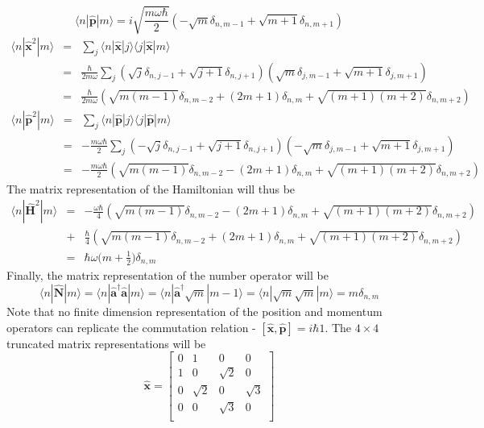 \documentclass[a4paper]{article}
\begin{document}
$$
\langle n|\mathbf{\hat{p}}|m\rangle=i\sqrt{\frac{m\omega\hbar}{2}}(-\sqrt{m}\delta_{n,m-1}+\sqrt{m+1}\delta_{n,m+1})
$$
\begin{eqnarray}
\langle n|\mathbf{\hat{x}}^2|m\rangle&=&\sum_j\langle n|\mathbf{\hat{x}}|j\rangle\langle j|\mathbf{\hat{x}}|m\rangle\nonumber\\&=&\frac{\hbar}{2m\omega}\sum_j(\sqrt{j}\delta_{n,j-1}+\sqrt{j+1}\delta_{n,j+1})(\sqrt{m}\delta_{j,m-1}+\sqrt{m+1}\delta_{j,m+1})\nonumber\\&=&\frac{\hbar}{2m\omega}(\sqrt{m(m-1)}\delta_{n,m-2}+(2m+1)\delta_{n,m}+\sqrt{(m+1)(m+2)}\delta_{n,m+2})\nonumber
\end{eqnarray}
\begin{eqnarray}
\langle n|\mathbf{\hat{p}}^2|m\rangle&=&\sum_j\langle n|\mathbf{\hat{p}}|j\rangle\langle j|\mathbf{\hat{p}}|m\rangle\nonumber\\&=&-\frac{m\omega\hbar}{2}\sum_j(-\sqrt{j}\delta_{n,j-1}+\sqrt{j+1}\delta_{n,j+1})(-\sqrt{m}\delta_{j,m-1}+\sqrt{m+1}\delta_{j,m+1})\nonumber\\&=&-\frac{m\omega\hbar}{2}(\sqrt{m(m-1)}\delta_{n,m-2}-(2m+1)\delta_{n,m}+\sqrt{(m+1)(m+2)}\delta_{n,m+2})\nonumber
\end{eqnarray}
The matrix representation of the Hamiltonian will thus be
\begin{eqnarray}
\langle n|\mathbf{\hat{H}}^2|m\rangle&=&-\frac{\omega\hbar}{4}(\sqrt{m(m-1)}\delta_{n,m-2}-(2m+1)\delta_{n,m}+\sqrt{(m+1)(m+2)}\delta_{n,m+2})\nonumber\\&+&\frac{\hbar}{4}(\sqrt{m(m-1)}\delta_{n,m-2}+(2m+1)\delta_{n,m}+\sqrt{(m+1)(m+2)}\delta_{n,m+2})\nonumber\\&=&\hbar\omega\bigg(m+\frac{1}{2}\bigg)\delta_{n,m}\nonumber
\end{eqnarray}
Finally, the matrix representation of the number operator will be
$$
\langle n|\mathbf{\hat{N}}|m\rangle=\langle n|\mathbf{\hat{a}}^\dag\mathbf{\hat{a}}|m\rangle=\langle n|\mathbf{\hat{a}}^\dag\sqrt{m}|m-1\rangle=\langle n|\sqrt{m}\sqrt{m}|m\rangle=m\delta_{n,m}
$$
Note that no finite dimension representation of the position and momentum operators can replicate the commutation relation - $[\mathbf{\hat{x}},\mathbf{\hat{p}}]=i\hbar1$. The $4\times4$ truncated matrix representations will be
$$
\mathbf{\hat{x}}=\begin{bmatrix}0&1&0&0\\1&0&\sqrt{2}&0\\0&\sqrt{2}&0&\sqrt{3}\\0&0&\sqrt{3}&0\\\end{bmatrix}
$$
\end{document}
